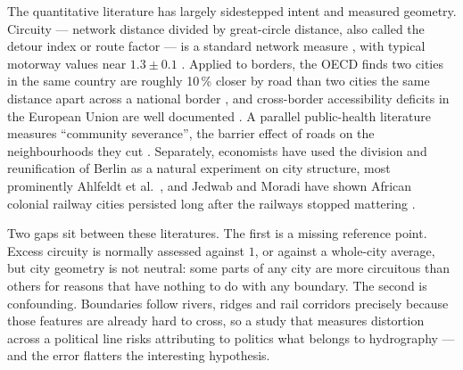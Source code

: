 \documentclass[11pt,a4paper]{article}
\begin{document}
The quantitative literature has largely sidestepped intent and measured
geometry. Circuity --- network distance divided by great-circle distance, also
called the detour index or route factor --- is a standard network measure
\cite{giacomin2015,levinson2020}, with typical motorway values near
$1.3 \pm 0.1$ \cite{npj2024}. Applied to borders, the OECD finds two cities in
the same country are roughly 10\,\% closer by road than two cities the same
distance apart across a national border \cite{oecd2013}, and cross-border
accessibility deficits in the European Union are well documented \cite{eu2019}.
A parallel public-health literature measures ``community severance'', the
barrier effect of roads on the neighbourhoods they cut \cite{severance2024}.
Separately, economists have used the division and reunification of Berlin as a
natural experiment on city structure, most prominently Ahlfeldt et al.\
\cite{ahlfeldt2015}, and Jedwab and Moradi have shown African colonial railway
cities persisted long after the railways stopped mattering \cite{jedwab2017}.

Two gaps sit between these literatures. The first is a missing reference point.
Excess circuity is normally assessed against $1$, or against a
whole-city average, but city geometry is not neutral: some parts of any city are
more circuitous than others for reasons that have nothing to do with any
boundary. The second is confounding. Boundaries follow rivers, ridges and rail
corridors precisely because those features are already hard to cross, so a study
that measures distortion across a political line risks attributing to politics
what belongs to hydrography --- and the error flatters the interesting
hypothesis.
\end{document}
